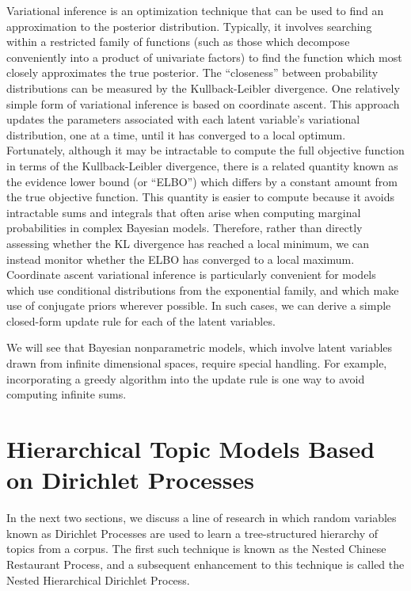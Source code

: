 \documentclass{article}
\begin{document}
Variational inference is an optimization technique that can be used to find an approximation to the posterior distribution.
Typically, it involves searching within a restricted family of functions (such as those which decompose conveniently into a product of univariate factors) to find the function which most closely approximates the true posterior.
The ``closeness'' between probability distributions can be measured by the Kullback-Leibler divergence.
One relatively simple form of variational inference is based on coordinate ascent.
This approach updates the parameters associated with each latent variable's variational distribution, one at a time, until it has converged to a local optimum.
Fortunately, although it may be intractable to compute the full objective function in terms of the Kullback-Leibler divergence, there is a related quantity known as the evidence lower bound (or ``ELBO'') which differs by a constant amount from the true objective function.
This quantity is easier to compute because it avoids intractable sums and integrals that often arise when computing marginal probabilities in complex Bayesian models.
Therefore, rather than directly assessing whether the KL divergence has reached a local minimum, we can instead monitor whether the ELBO has converged to a local maximum.
Coordinate ascent variational inference is particularly convenient for models which use conditional distributions from the exponential family, and which make use of conjugate priors wherever possible.
In such cases, we can derive a simple closed-form update rule for each of the latent variables.

We will see that Bayesian nonparametric models, which involve latent variables drawn from infinite dimensional spaces, require special handling.
For example, incorporating a greedy algorithm into the update rule is one way to avoid computing infinite sums.

\section{Hierarchical Topic Models Based on Dirichlet Processes}

In the next two sections, we discuss a line of research in which random variables known as Dirichlet Processes are used to learn a tree-structured hierarchy of topics from a corpus.
The first such technique is known as the Nested Chinese Restaurant Process, and a subsequent enhancement to this technique is called the Nested Hierarchical Dirichlet Process.
\end{document}
